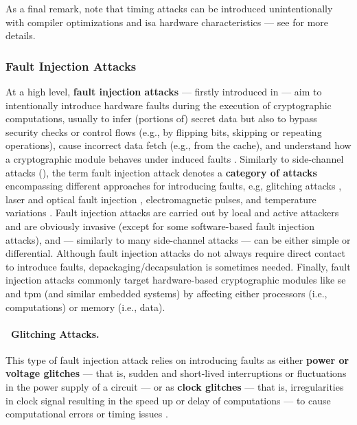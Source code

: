 As a final remark, note that timing attacks can be introduced unintentionally with compiler optimizations and \gls{isa} hardware characteristics --- see  for more details.


\subsubsection{Fault Injection Attacks}\label{sec:security_of_cryptographic_algorithms:attacks:fia}

At a high level, \textbf{fault injection attacks} --- firstly introduced in \cite{biham_differential_1997} --- aim to intentionally introduce hardware faults during the execution of cryptographic computations, usually to infer (portions of) secret data but also to bypass security checks or control flows (e.g., by flipping bits, skipping or repeating operations), cause incorrect data fetch (e.g., from the cache), and understand how a cryptographic module behaves under induced faults \cite{barenghi_fault_2012}. Similarly to side-channel attacks (), the term fault injection attack denotes a \textbf{category of attacks} encompassing different approaches for introducing faults, e.g, glitching attacks \cite{dutertre_review_2011}, laser and optical fault injection \cite{selmke_attack_2016}, electromagnetic pulses, and temperature variations \cite{chiu_sok_2023}. Fault injection attacks are carried out by local and active attackers and are obviously invasive (except for some software-based fault injection attacks), and --- similarly to many side-channel attacks --- can be either simple or differential. Although fault injection attacks do not always require direct contact to introduce faults, depackaging/decapsulation is sometimes needed. Finally, fault injection attacks commonly target hardware-based cryptographic modules like \gls{se} and \gls{tpm} (and similar embedded systems) by affecting either processors (i.e., computations) or memory (i.e., data).

\paragraph*{\faSignature~Glitching Attacks.} This type of fault injection attack relies on introducing faults as either \textbf{power or voltage glitches} \cite{bozzato_shaping_2019} --- that is, sudden and short-lived interruptions or fluctuations in the power supply of a circuit --- or as \textbf{clock glitches} --- that is, irregularities in clock signal resulting in the speed up or delay of computations --- to cause computational errors or timing issues \cite{endo_chip_2011}.

